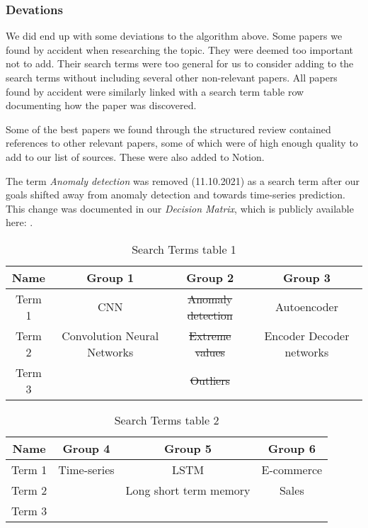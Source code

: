 \subsubsection{Devations}
We did end up with some deviations to the algorithm above.
Some papers we found by accident when researching the topic.
They were deemed too important not to add.
Their search terms were too general for us to consider adding to the search terms without including several other non-relevant papers.
All papers found by accident were similarly linked with a search term table row documenting
how the paper was discovered.

Some of the best papers we found through the structured review contained references to other relevant papers,
some of which were of high enough quality to add to our list of sources.
These were also added to Notion.

The term \textit{Anomaly detection} was removed (11.10.2021) as a search term after our goals shifted away from anomaly detection and towards time-series prediction.
This change was documented in our \textit{Decision Matrix}, which is publicly available here:
\cite{decisionmatrix}.

\begin{table}[h]
  \centering
  \begin{tabular}{|c|c|c|c|}\hline\hline
    Name   & Group 1                     & Group 2                  & Group 3                  \\ \hline
    Term 1 & CNN                         & \sout{Anomaly detection} & Autoencoder              \\ \hline
    Term 2 & Convolution Neural Networks & \sout{Extreme values}    & Encoder Decoder networks \\ \hline
    Term 3 &                             & \sout{Outliers}          &                          \\ \hline
  \end{tabular}
  \caption{Search Terms table 1}
  \label{tab:search-terms-table-1}
\end{table}%

\begin{table}[h]
  \begin{center}
    \begin{tabular}{|c|c|c|c|}\hline\hline
      Name   & Group 4     & Group 5                & Group 6    \\ \hline
      Term 1 & Time-series & LSTM                   & E-commerce \\ \hline
      Term 2 &             & Long short term memory & Sales      \\ \hline
      Term 3 &             &                        &            \\ \hline
    \end{tabular}
    \caption{Search Terms table 2}
    \label{tab:search-terms-table-2}
  \end{center}
\end{table}%

